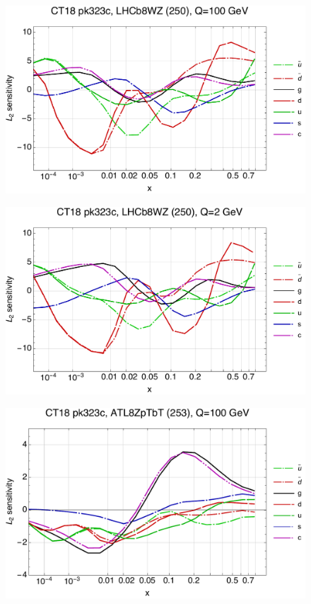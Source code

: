 \documentclass[10pt,aps,prd,floatfix,titlepage]{revtex4}
\begin{document}
\clearpage
\begin{figure}
\includegraphics[width=\textwidth,height=0.44\textheight,keepaspectratio]{1/250_ct18nn_L2_q100_Sf_1.pdf}
\caption{}
\end{figure}
\begin{figure}
\includegraphics[width=\textwidth,height=0.44\textheight,keepaspectratio]{1/250_ct18nn_L2_q2_Sf_1.pdf}
\caption{}
\end{figure}
\clearpage
\begin{figure}
\includegraphics[width=\textwidth,height=0.44\textheight,keepaspectratio]{1/253_ct18nn_L2_q100_Sf_1.pdf}
\caption{}
\end{figure}
\end{document}
